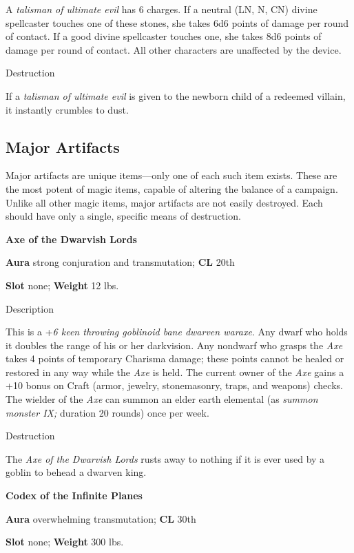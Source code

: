 A \textit{talisman of ultimate evil} has 6 charges. If a neutral (LN, N, CN) divine spellcaster touches one of these stones, she takes 6d6 points of damage per round of contact. If a good divine spellcaster touches one, she takes 8d6 points of damage per round of contact. All other characters are unaffected by the device. 
				
Destruction
				
If a \textit{talisman of ultimate evil} is given to the newborn child of a redeemed villain, it instantly crumbles to dust.
				
\subsection{Major Artifacts}

				
Major artifacts are unique items---only one of each such item exists. These are the most potent of magic items, capable of altering the balance of a campaign. Unlike all other magic items, major artifacts are not easily destroyed. Each should have only a single, specific means of destruction.
				
\textbf{Axe of the Dwarvish Lords}
				
\textbf{Aura} strong conjuration and transmutation; \textbf{CL} 20th
				
\textbf{Slot} none; \textbf{Weight} 12 lbs.
				
Description
				
This is a +\textit{6 keen throwing goblinoid bane dwarven waraxe}. Any dwarf who holds it doubles the range of his or her darkvision. Any nondwarf who grasps the \textit{Axe }takes 4 points of temporary Charisma damage; these points cannot be healed or restored in any way while the \textit{Axe }is held. The current owner of the \textit{Axe }gains a +10 bonus on Craft (armor, jewelry, stonemasonry, traps, and weapons) checks. The wielder of the \textit{Axe }can summon an elder earth elemental (as \textit{summon monster IX; }duration 20 rounds) once per week. 
				
Destruction
				
The \textit{Axe of the Dwarvish Lords }rusts away to nothing if it is ever used by a goblin to behead a dwarven king.
				
\textbf{Codex of the Infinite Planes}
				
\textbf{Aura} overwhelming transmutation; \textbf{CL} 30th
				
\textbf{Slot} none; \textbf{Weight} 300 lbs.
				
